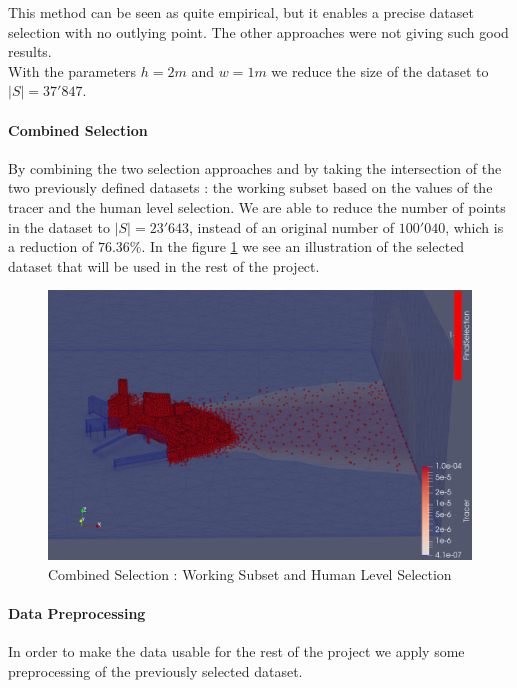 This method can be seen as quite empirical, but it enables a precise dataset selection with no outlying point. The other approaches were not giving such good results. \\

With the parameters $h = 2m$ and $w = 1m$ we reduce the size of the dataset to $|S| = 37'847$. 


\paragraph{Combined Selection}

By combining the two selection approaches and by taking the intersection of the two previously defined datasets : the working subset based on the values of the tracer and the human level selection. We are able to reduce the number of points in the dataset to $|S| = 23'643$, instead of an original number of $100'040$, which is a reduction of $76.36\%$. In the figure \ref{fig:combined_selection} we see an illustration of the selected dataset that will be used in the rest of the project. 

\begin{figure}[]
\centering
	\includegraphics[width = 0.8 \linewidth]{figures/DataAnalysis/FinalSelection_zoom}
	\caption{Combined Selection : Working Subset and Human Level Selection}
	\label{fig:combined_selection}
\end{figure}
 
\paragraph{Data Preprocessing}

In order to make the data usable for the rest of the project we apply some preprocessing of the previously selected dataset. \\

